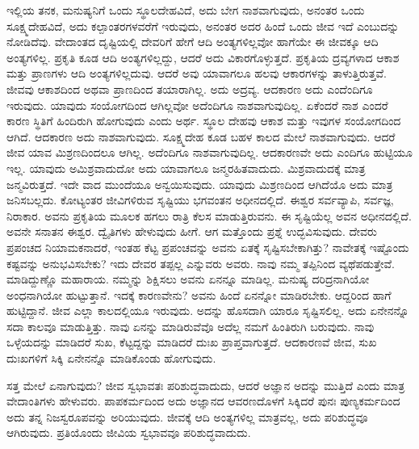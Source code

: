 ಇಲ್ಲಿಯ ತನಕ, ಮನುಷ್ಯನಿಗೆ ಒಂದು ಸ್ಥೂಲದೇಹವಿದೆ, ಅದು ಬೇಗ ನಾಶವಾಗುವುದು, ಅನಂತರ ಒಂದು ಸೂಕ್ಷ್ಮದೇಹವಿದೆ, ಅದು ಕಲ್ಪಾಂತರಗಳವರೆಗೆ ಇರುವುದು, ಅನಂತರ ಅದರ ಹಿಂದೆ ಒಂದು ಜೀವ ಇದೆ ಎಂಬುದನ್ನು ನೋಡಿದೆವು. ವೇದಾಂತದ ದೃಷ್ಟಿಯಲ್ಲಿ ದೇವರಿಗೆ ಹೇಗೆ ಆದಿ ಅಂತ್ಯಗಳಿಲ್ಲವೋ ಹಾಗೆಯೇ ಈ ಜೀವಕ್ಕೂ ಆದಿ ಅಂತ್ಯಗಳಿಲ್ಲ. ಪ್ರಕೃತಿ ಕೂಡ ಆದಿ ಅಂತ್ಯಗಳಿಲ್ಲದ್ದು, ಆದರೆ ಅದು ವಿಕಾರಗೊಳ್ಳುತ್ತದೆ. ಪ್ರಕೃತಿಯ ದ್ರವ್ಯಗಳಾದ ಆಕಾಶ ಮತ್ತು ಪ್ರಾಣಗಳು ಆದಿ ಅಂತ್ಯಗಳಿಲ್ಲದುವು. ಆದರೆ ಅವು ಯಾವಾಗಲೂ ಹಲವು ಆಕಾರಗಳನ್ನು ತಾಳುತ್ತಿರುತ್ತವೆ. ಜೀವವು ಆಕಾಶದಿಂದ ಅಥವಾ ಪ್ರಾಣದಿಂದ ತಯಾರಾಗಿಲ್ಲ. ಅದು ಅದ್ರವ್ಯ. ಆದಕಾರಣ ಅದು ಎಂದೆಂದಿಗೂ ಇರುವುದು. ಯಾವುದು ಸಂಯೋಗದಿಂದ ಆಗಿಲ್ಲವೋ ಅದೆಂದಿಗೂ ನಾಶವಾಗುವುದಿಲ್ಲ. ಏಕೆಂದರೆ ನಾಶ ಎಂದರೆ ಕಾರಣ ಸ್ಥಿತಿಗೆ ಹಿಂದಿರುಗಿ ಹೋಗುವುದು ಎಂದು ಅರ್ಥ. ಸ್ಥೂಲ ದೇಹವು ಆಕಾಶ ಮತ್ತು ಇವುಗಳ ಸಂಯೋಗದಿಂದ ಆಗಿದೆ. ಆದಕಾರಣ ಅದು ನಾಶವಾಗುವುದು. ಸೂಕ್ಷ್ಮದೇಹ ಕೂಡ ಬಹಳ ಕಾಲದ ಮೇಲೆ ನಾಶವಾಗುವುದು. ಆದರೆ ಜೀವ ಯಾವ ಮಿಶ್ರಣದಿಂದಲೂ ಆಗಿಲ್ಲ. ಅದೆಂದಿಗೂ ನಾಶವಾಗುವುದಿಲ್ಲ. ಆದಕಾರಣವೇ ಅದು ಎಂದಿಗೂ ಹುಟ್ಟಿಯೂ ಇಲ್ಲ. ಯಾವುದು ಅಮಿಶ್ರವಾದುದೋ ಅದು ಯಾವಾಗಲೂ ಜನ್ಮರಹಿತವಾದುದು. ಮಿಶ್ರವಾದುದಕ್ಕೆ ಮಾತ್ರ ಜನ್ಮವಿರುತ್ತದೆ. ಇದೇ ವಾದ ಮುಂದೆಯೂ ಅನ್ವಯಿಸುವುದು. ಯಾವುದು ಮಿಶ್ರಣದಿಂದ ಆಗಿದೆಯೊ ಅದು ಮಾತ್ರ ಜನಿಸಬಲ್ಲದು. ಕೋಟ್ಯಂತರ ಜೀವಿಗಳಿರುವ ಸೃಷ್ಟಿಯು ಭಗವಂತನ ಅಧೀನದಲ್ಲಿದೆ. ಈಶ್ವರ ಸರ್ವವ್ಯಾಪಿ, ಸರ್ವಜ್ಞ, ನಿರಾಕಾರ. ಅವನು ಪ್ರಕೃತಿಯ ಮೂಲಕ ಹಗಲು ರಾತ್ರಿ ಕೆಲಸ ಮಾಡುತ್ತಿರುವನು. ಈ ಸೃಷ್ಟಿಯೆಲ್ಲ ಅವನ ಅಧೀನದಲ್ಲಿದೆ. ಅವನೇ ಸನಾತನ ಈಶ್ವರ. ದ್ವೈತಿಗಳು ಹೇಳುವುದು ಹೀಗೆ. ಆಗ ಮತ್ತೊಂದು ಪ್ರಶ್ನೆ ಉದ್ಭವಿಸುವುದು. ದೇವರು ಪ್ರಪಂಚದ ನಿಯಾಮಕನಾದರೆ, ಇಂತಹ ಕೆಟ್ಟ ಪ್ರಪಂಚವನ್ನು ಅವನು ಏತಕ್ಕೆ ಸೃಷ್ಟಿಸಬೇಕಾಗಿತ್ತು? ನಾವೇತಕ್ಕೆ ಇಷ್ಟೊಂದು ಕಷ್ಟವನ್ನು ಅನುಭವಿಸಬೇಕು? ಇದು ದೇವರ ತಪ್ಪಲ್ಲ ಎನ್ನುವರು ಅವರು. ನಾವು ನಮ್ಮ ತಪ್ಪಿನಿಂದ ವ್ಯಥೆಪಡುತ್ತೇವೆ. ಮಾಡಿದ್ದುಣ್ಣೊ ಮಹಾರಾಯ. ನಮ್ಮನ್ನು ಶಿಕ್ಷಿಸಲು ಅವನು ಏನನ್ನೂ ಮಾಡಿಲ್ಲ. ಮನುಷ್ಯ ದರಿದ್ರನಾಗಿಯೋ ಅಂಧನಾಗಿಯೋ ಹುಟ್ಟುತ್ತಾನೆ. ಇದಕ್ಕೆ ಕಾರಣವೇನು? ಅವನು ಹಿಂದೆ ಏನನ್ನೋ ಮಾಡಿರಬೇಕು. ಆದ್ದರಿಂದ ಹಾಗೆ ಹುಟ್ಟಿದ್ದಾನೆ. ಜೀವ ಎಲ್ಲಾ ಕಾಲದಲ್ಲಿಯೂ ಇರುವುದು. ಅದನ್ನು ಹೊಸದಾಗಿ ಯಾರೂ ಸೃಷ್ಟಿಸಲಿಲ್ಲ. ಅದು ಏನೇನನ್ನೊ ಸದಾ ಕಾಲವೂ ಮಾಡುತ್ತಿತ್ತು. ನಾವು ಏನನ್ನು ಮಾಡಿರುವೆವೊ ಅದೆಲ್ಲ ನಮಗೆ ಹಿಂತಿರುಗಿ ಬರುವುದು. ನಾವು ಒಳ್ಳೆಯದನ್ನು ಮಾಡಿದರೆ ಸುಖ, ಕೆಟ್ಟದ್ದನ್ನು ಮಾಡಿದರೆ ದುಃಖ ಪ್ರಾಪ್ತವಾಗುತ್ತದೆ. ಆದಕಾರಣವೆ ಜೀವ, ಸುಖ ದುಃಖಗಳಿಗೆ ಸಿಕ್ಕಿ ಏನೇನನ್ನೊ ಮಾಡಿಕೊಂಡು ಹೋಗುವುದು.

ಸತ್ತ ಮೇಲೆ ಏನಾಗುವುದು? ಜೀವ ಸ್ವಭಾವತಃ ಪರಿಶುದ್ಧವಾದುದು, ಆದರೆ ಅಜ್ಞಾನ ಅದನ್ನು ಮುತ್ತಿದೆ ಎಂದು ಮಾತ್ರ ವೇದಾಂತಿಗಳು ಹೇಳುವರು. ಪಾಪಕರ್ಮದಿಂದ ಅದು ಅಜ್ಞಾನದ ಆವರಣದೊಳಗೆ ಸಿಕ್ಕಿದರೆ ಪುನಃ ಪುಣ್ಯಕರ್ಮದಿಂದ ಅದು ತನ್ನ ನಿಜಸ್ವರೂಪವನ್ನು ಅರಿಯುವುದು. ಜೀವಕ್ಕೆ ಆದಿ ಅಂತ್ಯಗಳಿಲ್ಲ ಮಾತ್ರವಲ್ಲ, ಅದು ಪರಿಶುದ್ಧವೂ ಆಗಿರುವುದು. ಪ್ರತಿಯೊಂದು ಜೀವಿಯ ಸ್ವಭಾವವೂ ಪರಿಶುದ್ಧವಾದುದು.

